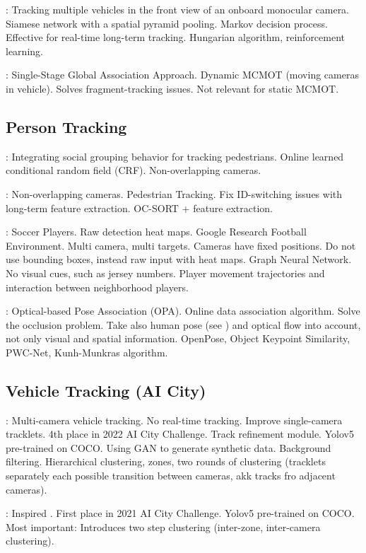 \cite{Zou19}: Tracking multiple vehicles in the front view of an onboard monocular camera. Siamese network with a spatial pyramid pooling. Markov decision process. Effective for real-time long-term tracking. Hungarian algorithm, reinforcement learning.

\cite{Nguyen22b}: Single-Stage Global Association Approach. Dynamic MCMOT (moving cameras in vehicle). Solves fragment-tracking issues. Not relevant for static MCMOT.

\subsection{Person Tracking}

\cite{Chen17b}: Integrating social grouping behavior for tracking pedestrians. Online learned conditional random field (CRF). Non-overlapping cameras.

\cite{Huang23}: Non-overlapping cameras. Pedestrian Tracking. Fix ID-switching issues with long-term feature extraction. OC-SORT + feature extraction.

\cite{Komorowski22}: Soccer Players. Raw detection heat maps. Google Research Football Environment. Multi camera, multi targets. Cameras have fixed positions. Do not use bounding boxes, instead raw input with heat maps. Graph Neural Network. No visual cues, such as jersey numbers. Player movement trajectories and interaction between neighborhood players.

\cite{You21}: Optical-based Pose Association (OPA). Online data association algorithm. Solve the occlusion problem. Take also human pose (see \cite{Li19}) and optical flow into account, not only visual and spatial information. OpenPose, Object Keypoint Similarity, PWC-Net, Kunh-Munkras algorithm.

\subsection{Vehicle Tracking (AI City)}

\cite{Specker22}: Multi-camera vehicle tracking. No real-time tracking. Improve single-camera tracklets. 4th place in 2022 AI City Challenge. Track refinement module. Yolov5 pre-trained on COCO. Using GAN to generate synthetic data. Background filtering. Hierarchical clustering, zones, two rounds of clustering (tracklets separately each possible transition between cameras, akk tracks fro adjacent cameras).

\cite{Lui21}: Inspired \cite{Specker22}. First place in 2021 AI City Challenge. Yolov5 pre-trained on COCO. Most important: Introduces two step clustering (inter-zone, inter-camera clustering).

